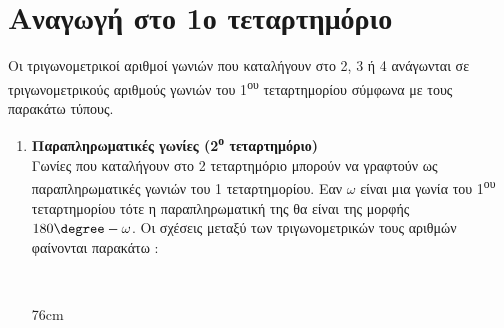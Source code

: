 \section{Αναγωγή στο 1ο τεταρτημόριο}
\thewrhmata
{}\label{th:an_tet}
Οι τριγωνομετρικοί αριθμοί γωνιών που καταλήγουν στο 2, 3 ή 4 ανάγωνται σε τριγωνομετρικούς αριθμούς γωνιών του 1\textsuperscript{ου} τεταρτημορίου σύμφωνα με τους παρακάτω τύπους.
\begin{enumerate}[itemsep=0mm,label=\bf\arabic*.]
\item \textbf{Παραπληρωματικές γωνίες (2\textsuperscript{ο} τεταρτημόριο)}\\
Γωνίες που καταλήγουν στο 2 τεταρτημόριο μπορούν να γραφτούν ως παραπληρωματικές γωνιών του 1 τεταρτημορίου. Εαν $ \omega $ είναι μια γωνία του 1\textsuperscript{ου} τεταρτημορίου τότε η παραπληρωματική της θα είναι της μορφής $ 180\degree-\omega $. Οι σχέσεις μεταξύ των τριγωνομετρικών τους αριθμών φαίνονται παρακάτω :\\
\begin{minipage}{\linewidth}\mbox{}\\
\vspace{-1.1cm}
\begin{WrapText1}{7}{6cm}
\end{WrapText1}
\end{minipage}
\end{enumerate}
